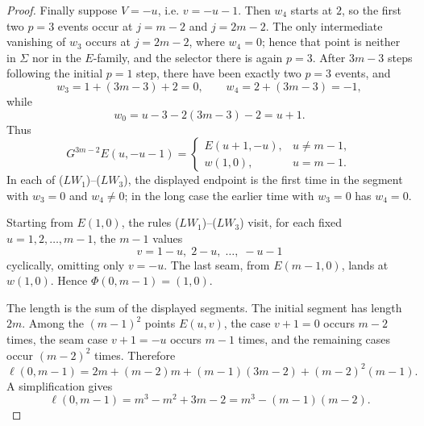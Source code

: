 \documentclass[10pt,a4paper]{amsart}
\begin{document}
\begin{proof}
Finally suppose \(V=-u\), i.e. \(v=-u-1\).  Then \(w_4\) starts at \(2\), so the first two \(p=3\)
events occur at \(j=m-2\) and \(j=2m-2\).  The only intermediate vanishing of \(w_3\) occurs at
\(j=2m-2\), where \(w_4=0\); hence that point is neither in \(\Sigma\) nor in the \(E\)-family, and the
selector there is again \(p=3\).  After \(3m-3\) steps following the initial \(p=1\) step, there have
been exactly two \(p=3\) events, and
\[
w_3=1+(3m-3)+2=0,
\qquad
w_4=2+(3m-3)=-1,
\]
while
\[
w_0=u-3-2(3m-3)-2=u+1.
\]
Thus
\[
G^{3m-2}E(u,-u-1)=
\begin{cases}
E(u+1,-u),&u\ne m-1,\\
w(1,0),&u=m-1.
\end{cases} \tag{$LW_3$}
\]
In each of \textup{(\(LW_1\))}--\textup{(\(LW_3\))}, the displayed endpoint is the first time in the
segment with \(w_3=0\) and \(w_4\ne0\); in the long case the earlier time with \(w_3=0\) has
\(w_4=0\).

Starting from \(E(1,0)\), the rules \textup{(\(LW_1\))}--\textup{(\(LW_3\))} visit, for each fixed
\(u=1,2,\ldots,m-1\), the \(m-1\) values
\[
v=1-u,\; 2-u,\; \ldots,\; -u-1
\]
cyclically, omitting only \(v=-u\).  The last seam, from \(E(m-1,0)\), lands at \(w(1,0)\).  Hence
\(\Phi(0,m-1)=(1,0)\).

The length is the sum of the displayed segments.  The initial segment has length \(2m\).  Among the
\((m-1)^2\) points \(E(u,v)\), the case \(v+1=0\) occurs \(m-2\) times, the seam case \(v+1=-u\)
occurs \(m-1\) times, and the remaining cases occur \((m-2)^2\) times.  Therefore
\[
\ell(0,m-1)=2m+(m-2)m+(m-1)(3m-2)+(m-2)^2(m-1).
\]
A simplification gives
\[
\ell(0,m-1)=m^3-m^2+3m-2=m^3-(m-1)(m-2).
\]
\end{proof}
\end{document}
